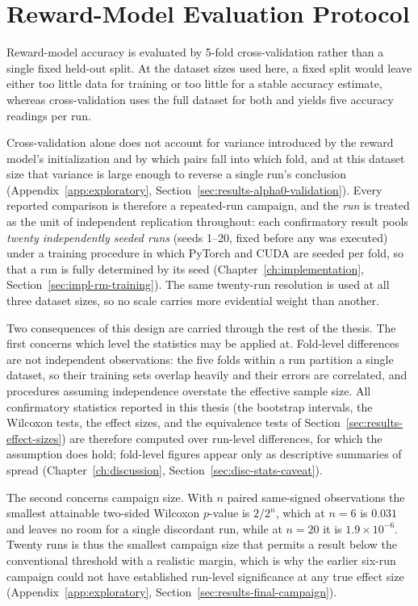 \section{Reward-Model Evaluation Protocol}
\label{sec:methodology-rm-eval}

Reward-model accuracy is evaluated by 5-fold cross-validation
\citep{kohavi1995crossvalidation} rather than a single fixed held-out split. At
the dataset sizes used here, a fixed split would leave either too little data
for training or too little for a stable accuracy estimate, whereas
cross-validation uses the full dataset for both and yields five accuracy
readings per run.

Cross-validation alone does not account for variance introduced by the reward
model's initialization and by which pairs fall into which fold, and at this
dataset size that variance is large enough to reverse a single run's conclusion
(Appendix~\ref{app:exploratory},
Section~\ref{sec:results-alpha0-validation}). Every reported comparison is
therefore a repeated-run campaign, and the \emph{run} is treated as the unit of
independent replication throughout: each confirmatory result pools
\emph{twenty independently seeded runs} (seeds 1--20, fixed before any was
executed) under a training procedure in which PyTorch and CUDA are seeded per
fold, so that a run is fully determined by its seed
(Chapter~\ref{ch:implementation}, Section~\ref{sec:impl-rm-training}). The same
twenty-run resolution is used at all three dataset sizes, so no scale carries
more evidential weight than another.

Two consequences of this design are carried through the rest of the thesis. The
first concerns which level the statistics may be applied at. Fold-level
differences are not independent observations: the five folds within a run
partition a single dataset, so their training sets overlap heavily and their
errors are correlated, and procedures assuming independence overstate the
effective sample size. All confirmatory statistics reported in this thesis (the
bootstrap intervals, the Wilcoxon tests, the effect sizes, and the equivalence
tests of Section~\ref{sec:results-effect-sizes}) are therefore computed over
run-level differences, for which the assumption does hold; fold-level figures
appear only as descriptive summaries of spread
(Chapter~\ref{ch:discussion}, Section~\ref{sec:disc-stats-caveat}).

The second concerns campaign size. With $n$ paired same-signed observations the
smallest attainable two-sided Wilcoxon $p$-value is $2/2^{n}$, which at $n=6$ is
$0.031$ and leaves no room for a single discordant run, while at $n=20$ it is
$1.9\times10^{-6}$. Twenty runs is thus the smallest campaign size that permits
a result below the conventional threshold with a realistic margin, which is why
the earlier six-run campaign could not have established run-level significance
at any true effect size (Appendix~\ref{app:exploratory},
Section~\ref{sec:results-final-campaign}).


